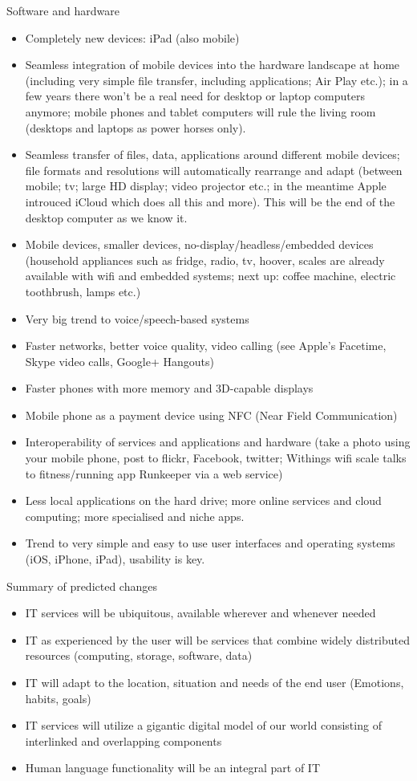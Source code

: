 \documentclass[10pt, plain]{../../metanetpaper}
\begin{document}
\begin{multicols}{2}
Software and hardware

\begin{itemize}
\item Completely new devices: iPad (also mobile)
\item Seamless integration of mobile devices into the hardware landscape at home (including very simple file transfer, including applications; Air Play etc.); in a few years there won’t be a real need for desktop or laptop computers anymore; mobile phones and tablet computers will rule the living room (desktops and laptops as power horses only).
\item Seamless transfer of files, data, applications around different mobile devices; file formats and resolutions will automatically rearrange and adapt (between mobile; tv; large HD display; video projector etc.; in the meantime Apple introuced iCloud which does all this and more). This will be the end of the desktop computer as we know it.
\item Mobile devices, smaller devices, no-display/headless/embedded devices (household appliances such as fridge, radio, tv, hoover, scales are already available with wifi and embedded systems; next up: coffee machine, electric toothbrush, lamps etc.)
\item Very big trend to voice/speech-based systems
\item Faster networks, better voice quality, video calling (see Apple’s Facetime, Skype video calls, Google+ Hangouts)
\item Faster phones with more memory and 3D-capable displays
\item Mobile phone as a payment device using NFC (Near Field Communication)
\item Interoperability of services and applications and hardware (take a photo using your mobile phone, post to flickr, Facebook, twitter; Withings wifi scale talks to fitness/running app Runkeeper via a web service)
\item Less local applications on the hard drive; more online services and cloud computing; more specialised and niche apps.
\item Trend to very simple and easy to use user interfaces and operating systems (iOS, iPhone, iPad), usability is key.
\end{itemize}

Summary of predicted changes

\begin{itemize}
\item IT services will be ubiquitous, available wherever and whenever needed
\item IT as experienced by the user will be services that combine widely distributed resources (computing, storage, software, data)
\item IT will adapt to the location, situation and needs of the end user (Emotions, habits, goals)
\item IT services will utilize a gigantic digital model of our world consisting of interlinked and overlapping components
\item Human language functionality will be an integral part of IT
\end{itemize}


\end{multicols}
\end{document}

